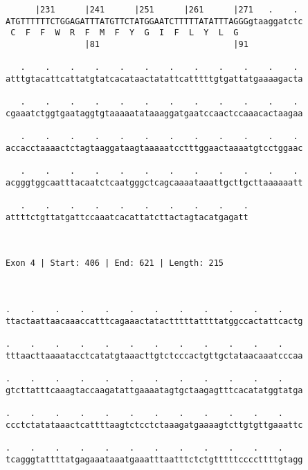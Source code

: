 \documentclass{article}
\begin{document}
\begin{Verbatim}
      |231      |241      |251      |261      |271   .    . 
ATGTTTTTTCTGGAGATTTATGTTCTATGGAATCTTTTTATATTTAGGGgtaaggatctc
 C  F  F  W  R  F  M  F  Y  G  I  F  L  Y  L  G             
                |81                           |91           
  
   .    .    .    .    .    .    .    .    .    .    .    . 
atttgtacattcattatgtatcacataactatattcatttttgtgattatgaaaagacta
                                                            
   .    .    .    .    .    .    .    .    .    .    .    . 
cgaaatctggtgaataggtgtaaaaatataaaggatgaatccaactccaaacactaagaa
                                                            
   .    .    .    .    .    .    .    .    .    .    .    . 
accacctaaaactctagtaaggataagtaaaaatcctttggaactaaaatgtcctggaac
                                                            
   .    .    .    .    .    .    .    .    .    .    .    . 
acgggtggcaatttacaatctcaatgggctcagcaaaataaattgcttgcttaaaaaatt
                                                            
   .    .    .    .    .    .    .    .    .    .
attttctgttatgattccaaatcacattatcttactagtacatgagatt
                                                 
                                                 
 
Exon 4 | Start: 406 | End: 621 | Length: 215



.    .    .    .    .    .    .    .    .    .    .    .    
ttactaattaacaaaccatttcagaaactatactttttattttatggccactattcactg
                                                            
.    .    .    .    .    .    .    .    .    .    .    .    
tttaacttaaaatacctcatatgtaaacttgtctcccactgttgctataacaaatcccaa
                                                            
.    .    .    .    .    .    .    .    .    .    .    .    
gtcttatttcaaagtaccaagatattgaaaatagtgctaagagtttcacatatggtatga
                                                            
.    .    .    .    .    .    .    .    .    .    .    .    
ccctctatataaactcattttaagtctcctctaaagatgaaaagtcttgtgttgaaattc
                                                            
.    .    .    .    .    .    .    .    .    .    .    .    
tcagggtattttatgagaaataaatgaaatttaatttctctgtttttccccttttgtagg
                                                            

\end{Verbatim}
\end{document}
